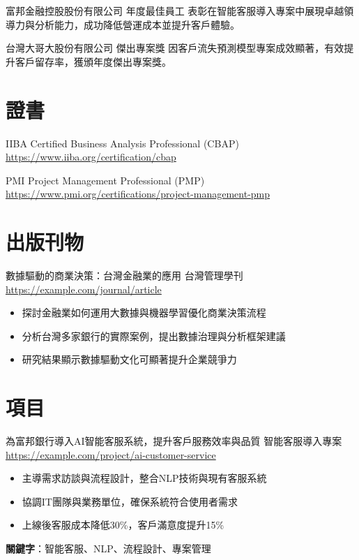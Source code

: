 \documentclass[a4paper, serif, 10pt]{moderncv}
\begin{document}
        {富邦金融控股股份有限公司}
        {年度最佳員工}
        {}
        {}
        {表彰在智能客服導入專案中展現卓越領導力與分析能力，成功降低營運成本並提升客戶體驗。}

        {台灣大哥大股份有限公司}
        {傑出專案獎}
        {}
        {}
        {因客戶流失預測模型專案成效顯著，有效提升客戶留存率，獲頒年度傑出專案獎。}
\section{證書}

        {IIBA}
        {Certified Business Analysis Professional (CBAP)}
        {\url{https://www.iiba.org/certification/cbap}}
        {}
        {}

        {PMI}
        {Project Management Professional (PMP)}
        {\url{https://www.pmi.org/certifications/project-management-pmp}}
        {}
        {}
\section{出版刊物}

        {數據驅動的商業決策：台灣金融業的應用}
        {台灣管理學刊}
        {\url{https://example.com/journal/article}}
        {}
        {\begin{itemize}
\item 探討金融業如何運用大數據與機器學習優化商業決策流程
\item 分析台灣多家銀行的實際案例，提出數據治理與分析框架建議
\item 研究結果顯示數據驅動文化可顯著提升企業競爭力
\end{itemize}}
\section{項目}

        {為富邦銀行導入AI智能客服系統，提升客戶服務效率與品質}
        {智能客服導入專案}
        {\url{https://example.com/project/ai-customer-service}}
        {}
        {\begin{itemize}
\item 主導需求訪談與流程設計，整合NLP技術與現有客服系統
\item 協調IT團隊與業務單位，確保系統符合使用者需求
\item 上線後客服成本降低30\%，客戶滿意度提升15\%
\end{itemize}
\textbf{關鍵字}：智能客服、NLP、流程設計、專案管理}
\end{document}
